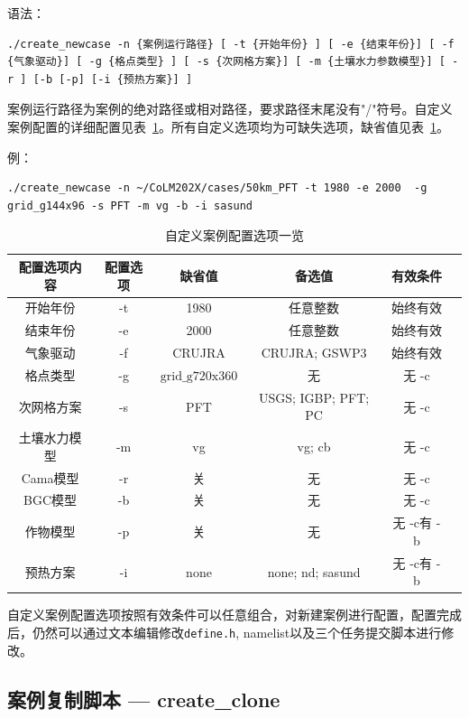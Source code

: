 语法：
\begin{lstlisting}[xleftmargin=2.5em]
./create_newcase -n {案例运行路径} [ -t {开始年份} ] [ -e {结束年份}] [ -f {气象驱动}] [ -g {格点类型} ] [ -s {次网格方案}] [ -m {土壤水力参数模型}] [ -r ] [-b [-p] [-i {预热方案}] ]
\end{lstlisting}

案例运行路径为案例的绝对路径或相对路径，要求路径末尾没有"/"符号。自定义案例配置的详细配置见表~\ref{tab:custom_option}。所有自定义选项均为可缺失选项，缺省值见表~\ref{tab:custom_option}。

例：
\begin{lstlisting}[xleftmargin=2.5em]
./create_newcase -n ~/CoLM202X/cases/50km_PFT -t 1980 -e 2000  -g grid_g144x96 -s PFT -m vg -b -i sasund
\end{lstlisting}

\begin{table}[!htbp]
\renewcommand{\arraystretch}{1.5}
\centering
\caption{自定义案例配置选项一览}\label{tab:custom_option}
\begin{tabular}{
cccccc} \toprule
\textbf{配置选项内容} & \textbf{配置选项} & \textbf{缺省值} & \textbf{备选值} & \textbf{有效条件}\\ \midrule
开始年份 & -t & 1980 & 任意整数 & 始终有效\\
结束年份 & -e & 2000 & 任意整数 & 始终有效\\
气象驱动 & -f & CRUJRA & CRUJRA; GSWP3  & 始终有效\\
格点类型 & -g & $\mathrm{grid}\_\mathrm{g}720\mathrm{x}360$ & 无& 无 -c\\
次网格方案 & -s & PFT & USGS; IGBP; PFT; PC & 无 -c\\
土壤水力模型 & -m & vg & vg; cb& 无 -c\\
Cama模型 & -r & 关 & 无& 无 -c\\
BGC模型 & -b & 关 & 无& 无 -c\\
作物模型 & -p & 关 & 无& 无 -c有 -b\\
预热方案 & -i & none & none; nd; sasund& 无 -c有 -b\\
\bottomrule
\end{tabular}
\end{table}

自定义案例配置选项按照有效条件可以任意组合，对新建案例进行配置，配置完成后，仍然可以通过文本编辑修改\texttt{define.h}, namelist以及三个任务提交脚本进行修改。

\subsection{案例复制脚本 --- create\_clone}

